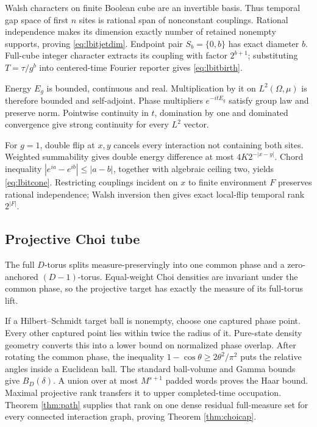 Walsh characters on finite Boolean cube are an invertible basis.  Thus
temporal gap space of first $n$ sites is rational span of nonconstant
couplings.  Rational independence makes its dimension exactly number of
retained nonempty supports, proving \eqref{eq:lbitjetdim}.  Endpoint pair
$S_b=\{0,b\}$ has exact diameter $b$.  Full-cube integer character extracts
its coupling with factor $2^{b+1}$; substituting
$T=\tau/g^b$ into centered-time Fourier reporter gives
\eqref{eq:lbitbirth}.

Energy $E_g$ is bounded, continuous and real.  Multiplication by it on
$L^2(\Omega,\mu)$ is therefore bounded and self-adjoint.  Phase
multipliers $e^{-itE_g}$ satisfy group law and preserve norm.  Pointwise
continuity in $t$, domination by one and dominated convergence give strong
continuity for every $L^2$ vector.

For $g=1$, double flip at $x,y$ cancels every interaction not containing
both sites.  Weighted summability gives double energy difference at most
$4K2^{-|x-y|}$.  Chord inequality
$|e^{ia}-e^{ib}|\le|a-b|$, together with algebraic ceiling two, yields
\eqref{eq:lbitcone}.  Restricting couplings incident on $x$ to finite
environment $F$ preserves rational independence; Walsh inversion then gives
exact local-flip temporal rank $2^{|F|}$.

\subsection{Projective Choi tube}

The full $D$-torus splits measure-preservingly into one common phase and a
zero-anchored $(D-1)$-torus.  Equal-weight Choi densities are invariant under
the common phase, so the projective target has exactly the measure of its
full-torus lift.

If a Hilbert--Schmidt target ball is nonempty, choose one captured phase
point.  Every other captured point lies within twice the radius of it.
Pure-state density geometry converts this into a lower bound on normalized
phase overlap.  After rotating the common phase, the inequality
$1-\cos\theta\ge2\theta^2/\pi^2$ puts the relative angles inside a Euclidean
ball.  The standard ball-volume and Gamma bounds give $B_D(\delta)$.  A union
over at most $M^{s+1}$ padded words proves the Haar bound.  Maximal projective
rank transfers it to upper completed-time occupation.  Theorem
\ref{thm:path} supplies that rank on one dense residual full-measure set for
every connected interaction graph, proving Theorem \ref{thm:choicap}.

